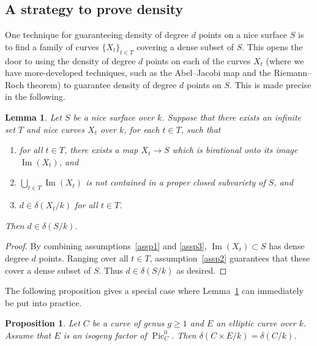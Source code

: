 \documentclass[a4paper,11pt]{amsart}
\theoremstyle{plain}
\newtheorem{lemma}[thm]{Lemma}
\newtheorem{prop}[thm]{Proposition}
\theoremstyle{remark}
\newcommand{\Pic}{\operatorname{Pic}}
\newcommand{\dendegs}{\delta}
\newcommand{\im}{\operatorname{Im}}
\begin{document}
\subsection{A strategy to prove density}
One technique for guaranteeing density of degree \(d\) points on a nice surface \(S\) is to find a family of curves \(\{X_t\}_{t \in T}\) covering a dense subset of \(S\).  This opens the door to using the density of degree \(d\) points on each of the curves \(X_t\) (where we have more-developed techniques, such as the Abel--Jacobi map and the Riemann--Roch theorem) to guarantee density of degree \(d\) points on \(S\).  This is made precise in the following.

\begin{lemma}\label{lem:covcurvs}
  Let $S$ be a nice surface over $k$.  Suppose that there exists an infinite set \(T\) and nice curves \(X_t\) over \(k\), for each \(t \in T\), such that
    \begin{enumerate}
        \item\label{assp1} for all $t \in T $, there exists a map \(X_t \to S\) which is birational onto its image \(\im(X_t)\), and
        \item\label{assp2} \(\bigcup_{t \in T} \im(X_t)\) is not contained in a proper closed subvariety of \(S\), and
        \item\label{assp3} \(d \in \dendegs(X_t/k)\) for all \(t \in T\). 
    \end{enumerate}
    Then \(d \in \dendegs(S/k)\).
\end{lemma}
\begin{proof}
    By combining assumptions~\eqref{assp1} and \eqref{assp3}, \(\im(X_t) \subset S\) has dense degree \(d\) points.  Ranging over all \(t \in T\), assumption~\eqref{assp2} guarantees that these cover a dense subset of \(S\).  Thus \(d \in \dendegs(S/k)\) as desired.
\end{proof}

The following proposition gives a special case where Lemma~\ref{lem:covcurvs} can immediately be put into practice. 
\begin{prop}\label{isogenyfactor}
    Let $C$ be a curve of genus $g\geq 1$ and $E$ an elliptic curve over $k$.
    Assume that $E$ is an isogeny factor of $\Pic^0_C$.
    Then $\dendegs(C\times E/k)=\dendegs(C/k)$. 
\end{prop}
\end{document}
